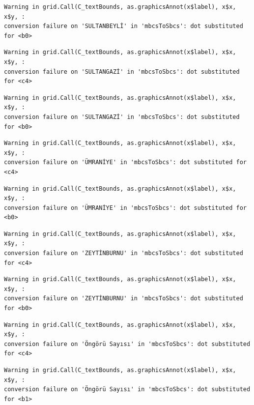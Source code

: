 \documentclass[
  11pt,
  a4paper,
  DIV=11,
  numbers=noendperiod]{scrartcl}
\begin{document}
\begin{verbatim}
Warning in grid.Call(C_textBounds, as.graphicsAnnot(x$label), x$x, x$y, :
conversion failure on 'SULTANBEYLİ' in 'mbcsToSbcs': dot substituted for <b0>
\end{verbatim}

\begin{verbatim}
Warning in grid.Call(C_textBounds, as.graphicsAnnot(x$label), x$x, x$y, :
conversion failure on 'SULTANGAZİ' in 'mbcsToSbcs': dot substituted for <c4>
\end{verbatim}

\begin{verbatim}
Warning in grid.Call(C_textBounds, as.graphicsAnnot(x$label), x$x, x$y, :
conversion failure on 'SULTANGAZİ' in 'mbcsToSbcs': dot substituted for <b0>
\end{verbatim}

\begin{verbatim}
Warning in grid.Call(C_textBounds, as.graphicsAnnot(x$label), x$x, x$y, :
conversion failure on 'ÜMRANİYE' in 'mbcsToSbcs': dot substituted for <c4>
\end{verbatim}

\begin{verbatim}
Warning in grid.Call(C_textBounds, as.graphicsAnnot(x$label), x$x, x$y, :
conversion failure on 'ÜMRANİYE' in 'mbcsToSbcs': dot substituted for <b0>
\end{verbatim}

\begin{verbatim}
Warning in grid.Call(C_textBounds, as.graphicsAnnot(x$label), x$x, x$y, :
conversion failure on 'ZEYTİNBURNU' in 'mbcsToSbcs': dot substituted for <c4>
\end{verbatim}

\begin{verbatim}
Warning in grid.Call(C_textBounds, as.graphicsAnnot(x$label), x$x, x$y, :
conversion failure on 'ZEYTİNBURNU' in 'mbcsToSbcs': dot substituted for <b0>
\end{verbatim}

\begin{verbatim}
Warning in grid.Call(C_textBounds, as.graphicsAnnot(x$label), x$x, x$y, :
conversion failure on 'Öngörü Sayısı' in 'mbcsToSbcs': dot substituted for <c4>
\end{verbatim}

\begin{verbatim}
Warning in grid.Call(C_textBounds, as.graphicsAnnot(x$label), x$x, x$y, :
conversion failure on 'Öngörü Sayısı' in 'mbcsToSbcs': dot substituted for <b1>
\end{verbatim}
\end{document}
